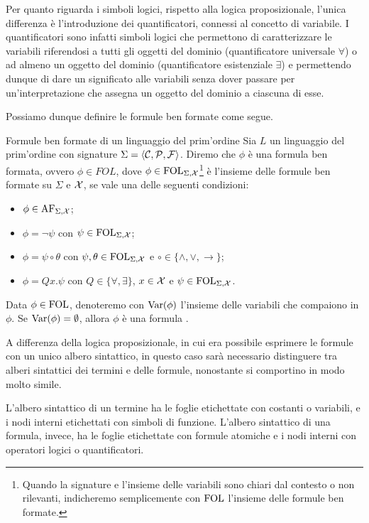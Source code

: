 Per quanto riguarda i simboli logici, rispetto alla logica proposizionale, l'unica differenza è l'introduzione dei quantificatori, connessi al concetto di variabile. I quantificatori sono infatti simboli logici che permettono di caratterizzare le variabili riferendosi a tutti gli oggetti del dominio (quantificatore universale \(\forall\)) o ad almeno un oggetto del dominio (quantificatore esistenziale \(\exists\)) e permettendo dunque di dare un significato alle variabili senza dover passare per un'interpretazione che assegna un oggetto del dominio a ciascuna di esse.

Possiamo dunque definire le formule ben formate come segue.
\begin{definition}{Formule ben formate di un linguaggio del prim'ordine}
  Sia \(L\) un linguaggio del prim'ordine con signature \(\Sigma = \langle \mathcal{C}, \mathcal{P}, \mathcal{F} \rangle\). Diremo che \(\phi\) è una formula ben formata, ovvero \(\phi \in FOL\), dove \(\phi \in \FOL[\Sigma,\VarSyms]\)\footnote{Quando la signature e l'insieme delle variabili sono chiari dal contesto o non rilevanti, indicheremo semplicemente con \(\FOL\) l'insieme delle formule ben formate.} è l'insieme delle formule ben formate su \(\Sigma\) e \(\mathcal{X}\), se vale una delle seguenti condizioni:
  \begin{itemize}
    \item \(\phi\in\AF[\Sigma,\VarSyms]\);
    \item \(\phi = \neg\psi\) con \(\psi\in\FOL[\Sigma,\VarSyms]\);
    \item \(\phi = \psi\circ\theta\) con \(\psi,\theta\in\FOL[\Sigma,\VarSyms]\) e \(\circ\in\{\land,\lor,\to\}\);
    \item \(\phi = Qx.\psi\) con \(Q\in\{\forall,\exists\}\), \(x\in\mathcal{X}\) e \(\psi\in\FOL[\Sigma,\VarSyms]\).
  \end{itemize}

  Data \(\phi\in\FOL\), denoteremo con \(\operatorname{Var}(\phi)\) l'insieme delle variabili che compaiono in \(\phi\). Se \(\operatorname{Var}(\phi)=\emptyset\), allora \(\phi\) è una formula .
\end{definition}

A differenza della logica proposizionale, in cui era possibile esprimere le formule con un unico albero sintattico, in questo caso sarà necessario distinguere tra alberi sintattici dei termini e delle formule, nonostante si comportino in modo molto simile.

L'albero sintattico di un termine ha le foglie etichettate con costanti o variabili, e i nodi interni etichettati con simboli di funzione. L'albero sintattico di una formula, invece, ha le foglie etichettate con formule atomiche e i nodi interni con operatori logici o quantificatori.

